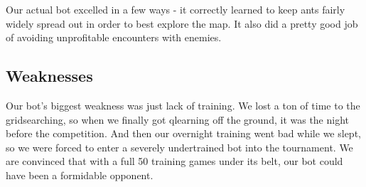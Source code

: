 \documentclass{article}
\begin{document}
Our actual bot excelled in a few ways - it correctly learned to keep ants fairly widely spread out in order to best explore the map.
It also did a pretty good job of avoiding unprofitable encounters with enemies.
\subsection*{Weaknesses}
Our bot's biggest weakness was just lack of training. We lost a ton of time to the gridsearching, so when we finally got qlearning
off the ground, it was the night before the competition. And then our overnight training went bad while we slept, so we were forced
to enter a severely undertrained bot into the tournament. We are convinced that with a full 50 training games under its belt, our bot could
have been a formidable opponent.
\end{document}
